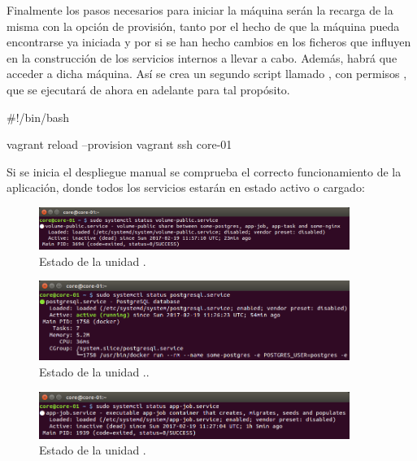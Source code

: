Finalmente los pasos necesarios para iniciar la máquina serán la recarga de la misma con la opción de provisión, tanto por el hecho de que la máquina pueda encontrarse ya iniciada y por si se han hecho cambios en los ficheros que influyen en la construcción de los servicios internos a llevar a cabo. Además, habrá que acceder a dicha máquina. Así se crea un segundo script llamado , con permisos , que se ejecutará de ahora en adelante para tal propósito.

\begin{codelisting}
\label{code:vagrantfile2}
\begin{code}
#!/bin/bash

vagrant reload --provision
vagrant ssh core-01
\end{code}
\end{codelisting}

Si se inicia el despliegue manual se comprueba el correcto funcionamiento de la aplicación, donde todos los servicios estarán en estado activo o cargado:


\begin{figure}[H]
\centering
\includegraphics[width=0.9\textwidth]{images/figures/volume-public.service.png}
\caption{Estado de la unidad .\label{fig:figure_placement_example}}
\end{figure}

\begin{figure}[H]
\centering
\includegraphics[width=0.9\textwidth]{images/figures/postgresql.service.png}
\caption{Estado de la unidad ..\label{fig:figure_placement_example}}
\end{figure}

\begin{figure}[H]
\centering
\includegraphics[width=0.9\textwidth]{images/figures/app-job.service.png}
\caption{Estado de la unidad .\label{fig:figure_placement_example}}
\end{figure}

